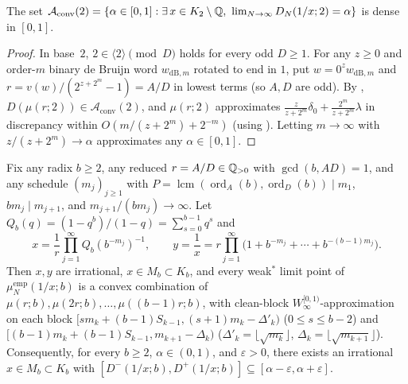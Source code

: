 \documentclass[11pt]{article}
\DeclareMathOperator{\ord}{ord}
\DeclareMathOperator{\lcm}{lcm}
\begin{document}
\begin{corollary}\label{cor:dense-Aconv2}
The set $\mathcal A_{\mathrm{conv}}(2)=\{\alpha\in[0,1]:\exists\,x\in K_2\setminus\Q,\ \lim_{N\to\infty}D_N(1/x;2)=\alpha\}$ is dense in $[0,1]$.
\end{corollary}

\begin{proof}
In base~$2$, $2\in\langle 2\rangle\pmod D$ holds for every odd $D\ge1$. For any $z\ge0$ and order-$m$ binary de Bruijn word $w_{\mathrm{dB},m}$ rotated to end in $1$, put $w=0^z w_{\mathrm{dB},m}$ and $r=v(w)/(2^{z+2^m}-1)=A/D$ in lowest terms (so $A,D$ are odd). By , $D(\mu(r;2))\in\mathcal A_{\mathrm{conv}}(2)$, and $\mu(r;2)$ approximates $\frac{z}{z+2^m}\delta_0+\frac{2^m}{z+2^m}\lambda$ in discrepancy within $O(m/(z+2^m)+2^{-m})$ (using ). Letting $m\to\infty$ with $z/(z+2^m)\to\alpha$ approximates any $\alpha\in[0,1]$.
\end{proof}

\begin{proposition}\label{prop:repunit-inversion}
Fix any radix $b\ge2$, any reduced $r=A/D\in\mathbb Q_{>0}$ with $\gcd(b,AD)=1$, and any schedule $(m_j)_{j\ge1}$ with $P=\lcm(\ord_A(b),\ord_D(b))\mid m_1$, $bm_j\mid m_{j+1}$, and $m_{j+1}/(bm_j)\to\infty$. Let $Q_b(q)=(1-q^b)/(1-q)=\sum_{s=0}^{b-1}q^s$ and
\[
x=\frac1r\prod_{j=1}^\infty Q_b(b^{-m_j})^{-1},\qquad y=\frac1x=r\prod_{j=1}^\infty\bigl(1+b^{-m_j}+\cdots+b^{-(b-1)m_j}\bigr).
\]
Then $x,y$ are irrational, $x\in M_b\subset K_b$, and every weak$^*$ limit point of $\mu_N^{\mathrm{emp}}(1/x;b)$ is a convex combination of $\mu(r;b),\mu(2r;b),\dots,\mu((b-1)r;b)$, with clean-block $W_\infty^{[0,1)}$-approximation on each block $[sm_k+(b-1)S_{k-1},(s+1)m_k-\Delta'_k)$ ($0\le s\le b-2$) and $[(b-1)m_k+(b-1)S_{k-1},m_{k+1}-\Delta_k)$ ($\Delta'_k=\lfloor\sqrt{m_k}\rfloor$, $\Delta_k=\lfloor\sqrt{m_{k+1}}\rfloor$). Consequently, for every $b\ge2$, $\alpha\in(0,1)$, and $\varepsilon>0$, there exists an irrational $x\in M_b\subset K_b$ with $[D^-(1/x;b),D^+(1/x;b)]\subseteq[\alpha-\varepsilon,\alpha+\varepsilon]$.
\end{proposition}
\end{document}
